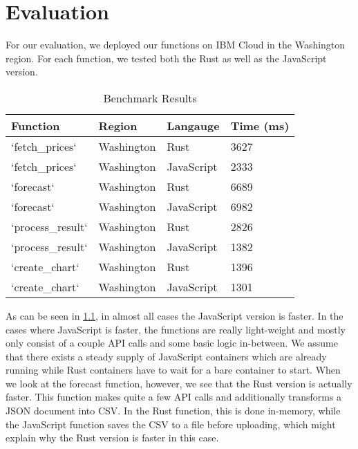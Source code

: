 \chapter{\label{chap:evaluation}Evaluation}

For our evaluation, we deployed our functions on IBM Cloud in the Washington region.
For each function, we tested both the Rust as well as the JavaScript version.

\begin{table}[h]
  \centering
  \begin{tabular}{|l|l|l|l|}
    \hline
    Function          & Region     & Langauge   & Time (ms) \\ \hline
    `fetch\_prices`   & Washington & Rust       & 3627      \\ \hline
    `fetch\_prices`   & Washington & JavaScript & 2333      \\ \hline
    `forecast`        & Washington & Rust       & 6689      \\ \hline
    `forecast`        & Washington & JavaScript & 6982      \\ \hline
    `process\_result` & Washington & Rust       & 2826      \\ \hline
    `process\_result` & Washington & JavaScript & 1382      \\ \hline
    `create\_chart`   & Washington & Rust       & 1396      \\ \hline
    `create\_chart`   & Washington & JavaScript & 1301      \\ \hline
  \end{tabular}
  \caption{Benchmark Results}
  \label{tab:benchmark}
\end{table}

As can be seen in \cref{tab:benchmark}, in almost all cases the JavaScript version is faster.
In the cases where JavaScript is faster, the functions are really light-weight and
mostly only consist of a couple API calls and some basic logic in-between. We assume
that there exists a steady supply of JavaScript containers which are already
running while Rust containers have to wait for a bare container to start.
When we look at the forecast function, however, we see that the Rust version is actually faster.
This function makes quite a few API calls and additionally transforms a JSON document
into CSV. In the Rust function, this is done in-memory, while the JavaScript function
saves the CSV to a file before uploading, which might explain why the Rust version
is faster in this case.


